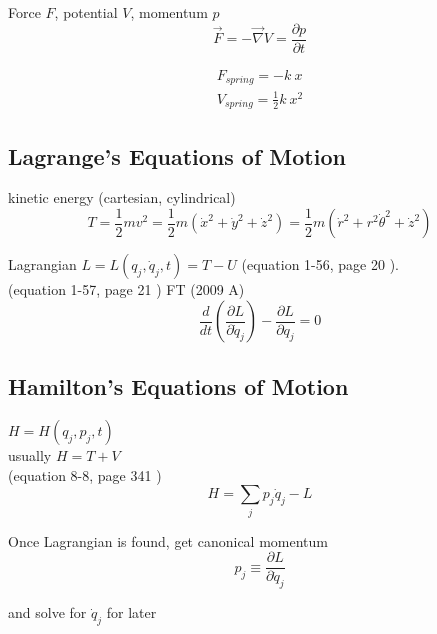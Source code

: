 \documentclass[12pt]{article}  %
\newcommand{\pfrac}[2]{\frac{\partial #1}{\partial #2}}
\def\qualifyingyear{F}
\begin{document}
Force $F$, potential $V$, momentum $p$
\begin{equation}
 \vec{F} = -\vec{\nabla} V = \pfrac{p}{t}
\end{equation}

\begin{equation}
\begin{gathered}
F_{spring} = -k \ x \\ 
V_{spring} = \frac{1}{2}k \ x^2
\end{gathered}
\end{equation}

\subsection{Lagrange's Equations of Motion}

kinetic energy (cartesian, cylindrical)
\begin{equation}
T = \frac{1}{2} m v^2 = \frac{1}{2} m ( \dot{x}^2 + \dot{y}^2 + \dot{z}^2) = 
\frac{1}{2} m (\dot{r}^2 + r^2 \dot{\theta}^2 + \dot{z}^2)
\end{equation}

Lagrangian
$L=L\left( q_{j} ,\dot{q} _{j} ,t\right) =T-U$ (equation 1-56, page 20 \cite{GoldsteinCM}). \\ 
(equation 1-57, page 21 \cite{GoldsteinCM})
\if\qualifyingyear T
(2009 A)
\fi
\begin{equation}
\frac{d}{dt} \left( \frac{\partial L}{\partial \dot{q} _{j} } \right) -\frac{\partial L}{\partial q_{j} } = 0
\end{equation}

\subsection{Hamilton's Equations of Motion}
$H=H\left( q_{j} ,p_{j} ,t\right) $ \\ 
usually $ H = T+V$ \\ 
(equation 8-8, page 341 \cite{GoldsteinCM})
\begin{equation}
H=\sum\limits_{j}p_{j}  \dot{q} _{j} -L
\end{equation}

Once Lagrangian is found, get canonical momentum
\begin{equation}
p_j \equiv \frac{\partial L}{\partial \dot{q}_j }
\label{eq:canonical_momentum}
\end{equation}

and solve for $\dot{q}_j$ for later
\end{document}

